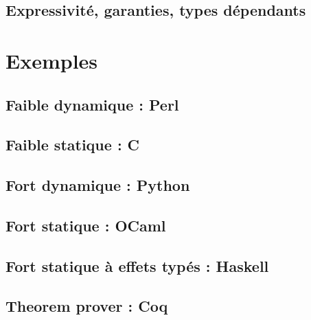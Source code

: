 \subsection{Expressivité, garanties, types dépendants}

\section{Exemples}

\subsection{Faible dynamique : Perl}
\subsection{Faible statique : C}
\subsection{Fort dynamique : Python}
\subsection{Fort statique : OCaml}
\subsection{Fort statique à effets typés : Haskell}
\subsection{Theorem prover : Coq}
